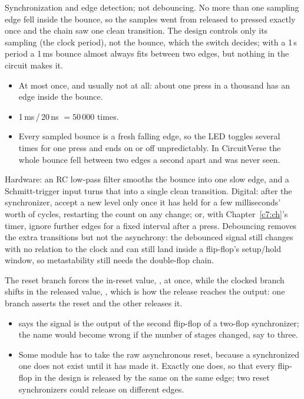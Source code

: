 Synchronization and edge detection; not debouncing.
No more than one sampling edge fell inside the bounce, so the samples went from released to
pressed exactly once and the chain saw one clean transition. The design controls only its sampling
(the clock period), not the bounce, which the switch decides; with a 1\,s period a 1\,ms bounce
almost always fits between two edges, but nothing in the circuit makes it.
\begin{itemize}
  \item At most once, and usually not at all: about one press in a thousand has an edge inside the
    bounce.
  \item 1\,ms\,/\,20\,ns $= 50\,000$ times.
  \item Every sampled bounce is a fresh falling edge, so the LED toggles several times for one press
    and ends on or off unpredictably. In CircuitVerse the whole bounce fell between two edges a
    second apart and was never seen.
\end{itemize}
Hardware: an RC low-pass filter smooths the bounce into one slow edge, and a Schmitt-trigger
input turns that into a single clean transition. Digital: after the synchronizer, accept a new level
only once it has held for a few milliseconds' worth of cycles, restarting the count on any change;
or, with Chapter~\ref{c7:ch}'s timer, ignore further edges for a fixed interval after a press.
Debouncing removes the extra transitions but not the asynchrony: the debounced signal still
changes with no relation to the clock and can still land inside a flip-flop's setup/hold window, so
metastability still needs the double-flop chain.

The reset branch forces the in-reset value, , at once, while the clocked branch
shifts in the released value, , which is how the release reaches the output: one branch
asserts the reset and the other releases it.
\begin{itemize}
  \item {} says the signal is the output of the second flip-flop of a two-flop synchronizer;
    the name would become wrong if the number of stages changed, say to three.
  \item Some module has to take the raw asynchronous reset, because a synchronized one does not
    exist until it has made it. Exactly one does, so that every flip-flop in the design is released
    by the same  on the same edge; two reset synchronizers could release on
    different edges.
\end{itemize}

